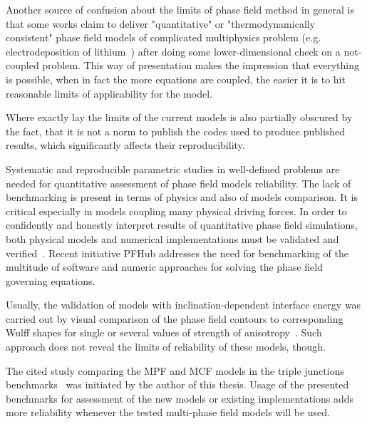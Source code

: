 Another source of confusion about the limits of phase field method in general is that some works claim to deliver "quantitative" or "thermodynamically consistent" phase field models of complicated multiphysics problem (e.g. electrodeposition of lithium~\cite{Chen2015}) after doing some lower-dimensional check on a not-coupled problem. This way of presentation makes the impression that everything is possible, when in fact the more equations are coupled, the easier it is to hit reasonable limits of applicability for the model.

Where exactly lay the limits of the current models is also partially obscured by the fact, that it is not a norm to publish the codes used to produce published results, which significantly affects their reproducibility. 

Systematic and reproducible parametric studies in well-defined problems are needed for quantitative assessment of phase field models reliability. The lack of benchmarking is present in terms of physics and also of models comparison. It is critical especially in models coupling many physical driving forces. In order to confidently and honestly interpret results of quantitative phase field simulations, both physical models and numerical implementations must be validated and verified~\cite{Jokisaari2017}. Recent initiative PFHub addresses the need for benchmarking of the multitude of software and numeric approaches for solving the phase field governing equations. 

Usually, the validation of models with inclination-dependent interface energy was carried out by visual comparison of the phase field contours to corresponding Wulff shapes for single or several values of strength of anisotropy~\cite{Garcke1999,Eggleston2001,Fleck2011,Ma2006,Tschukin2017}. Such approach does not reveal the limits of reliability of these models, though.

The cited study comparing the MPF and MCF models in the triple junctions benchmarks~\cite{Daubner2023} was initiated by the author of this thesis. Usage of the presented benchmarks for assessment of the new models or existing implementations adds more reliability whenever the tested multi-phase field models will be used.

\cleardoublepage

